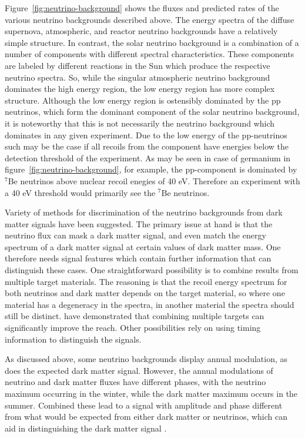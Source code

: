 \documentclass[b5paper, 10pt, twoside]{book}
\begin{document}
Figure~\ref{fig:neutrino-background} shows the fluxes and predicted rates of the various neutrino backgrounds described above. The energy spectra of the diffuse supernova, atmospheric, and reactor neutrino backgrounds have a relatively simple structure. In contrast, the solar neutrino background is a combination of a number of components with different spectral characteristics. These components are labeled by different reactions in the Sun which produce the respective neutrino spectra. So, while the singular atmospheric neutrino background dominates the high energy region, the low energy region has more complex structure. Although the low energy region is ostensibly dominated by the pp neutrinos, which form the dominant component of the solar neutrino background, it is noteworthy that this is not necessarily the neutrino background which dominates in any given experiment. Due to the low energy of the pp-neutrinos such may be the case if all recoils from the component have energies below the detection threshold of the experiment. As may be seen in case of germanium in figure~\ref{fig:neutrino-background}, for example, the pp-component is dominated by $^{7}$Be neutrinos above nuclear recoil enegies of 40 eV. Therefore an experiment with a 40 eV threshold would primarily see the $^{7}$Be neutrinos.

Variety of methods for discrimination of the neutrino backgrounds from dark matter signals have been suggested. The primary issue at hand is that the neutrino flux can mask a dark matter signal, and even match the energy spectrum of a dark matter signal at certain values of dark matter mass. One therefore needs signal features which contain further information that can distinguish these cases. One straightforward possibility is to combine results from multiple target materials. The reasoning is that the recoil energy spectrum for both neutrinos and dark matter depends on the target material, so where one material has a degeneracy in the spectra, in another material the spectra should still be distinct. \textcite{BillardFigueroaFelicianoStrigari2014} have demonstrated that combining multiple targets can significantly improve the reach. Other possibilities rely on using timing information to distinguish the signals.

As discussed above, some neutrino backgrounds display annual modulation, as does the expected dark matter signal. However, the annual modulations of neutrino and dark matter fluxes have different phases, with the neutrino maximum occurring in the winter, while the dark matter maximum occurs in the summer. Combined these lead to a signal with amplitude and phase different from what would be expected from either dark matter or neutrinos, which can aid in distinguishing the dark matter signal \parencite{Davis2015}.
\end{document}
